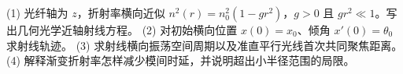 (1) 光纤轴为 \(z\)，折射率横向近似 \(n^2(r)=n_0^2(1-gr^2)\)，\(g>0\) 且 \(gr^2\ll1\)。写出几何光学近轴射线方程。
(2) 对初始横向位置 \(x(0)=x_0\)、倾角 \(x'(0)=\theta_0\) 求射线轨迹。
(3) 求射线横向振荡空间周期以及准直平行光线首次共同聚焦距离。
(4) 解释渐变折射率怎样减少模间时延，并说明超出小半径范围的局限。
